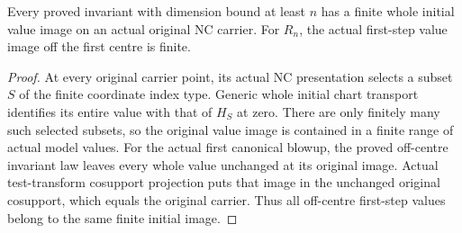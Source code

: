 \begin{lemma}
\label{hir:general-nc-initial-and-first-off-centre-finite-values}
\leanok
{}
Every proved invariant with dimension bound at least $n$ has a finite
whole initial value image on an actual original NC carrier. For $R_n$,
the actual first-step value image off the first centre is finite.
\end{lemma}
\begin{proof}
At every original carrier point, its actual NC presentation selects a
subset $S$ of the finite coordinate index type. Generic whole initial
chart transport identifies its entire value with that of $H_S$ at zero.
There are only finitely many such selected subsets, so the original
value image is contained in a finite range of actual model values.
For the actual first canonical blowup, the proved off-centre invariant
law leaves every whole value unchanged at its original image. Actual
test-transform cosupport projection puts that image in the unchanged
original cosupport, which equals the original carrier. Thus all
off-centre first-step values belong to the same finite initial image.
\end{proof}

